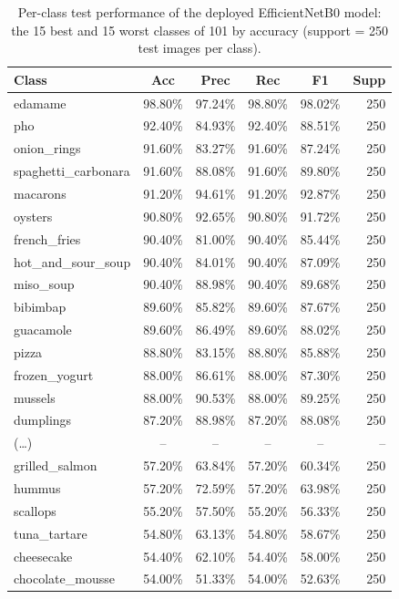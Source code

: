 \begin{table}[t]
\centering
\caption{Per-class test performance of the deployed EfficientNetB0 model: the 15 best and 15 worst classes of 101 by accuracy (support = 250 test images per class).}
\label{tbl:perclass}
\small
\begin{tabular}{lccccr}
\toprule
Class & Acc & Prec & Rec & F1 & Supp \\
\midrule
edamame & 98.80\% & 97.24\% & 98.80\% & 98.02\% & 250 \\
pho & 92.40\% & 84.93\% & 92.40\% & 88.51\% & 250 \\
onion\_rings & 91.60\% & 83.27\% & 91.60\% & 87.24\% & 250 \\
spaghetti\_carbonara & 91.60\% & 88.08\% & 91.60\% & 89.80\% & 250 \\
macarons & 91.20\% & 94.61\% & 91.20\% & 92.87\% & 250 \\
oysters & 90.80\% & 92.65\% & 90.80\% & 91.72\% & 250 \\
french\_fries & 90.40\% & 81.00\% & 90.40\% & 85.44\% & 250 \\
hot\_and\_sour\_soup & 90.40\% & 84.01\% & 90.40\% & 87.09\% & 250 \\
miso\_soup & 90.40\% & 88.98\% & 90.40\% & 89.68\% & 250 \\
bibimbap & 89.60\% & 85.82\% & 89.60\% & 87.67\% & 250 \\
guacamole & 89.60\% & 86.49\% & 89.60\% & 88.02\% & 250 \\
pizza & 88.80\% & 83.15\% & 88.80\% & 85.88\% & 250 \\
frozen\_yogurt & 88.00\% & 86.61\% & 88.00\% & 87.30\% & 250 \\
mussels & 88.00\% & 90.53\% & 88.00\% & 89.25\% & 250 \\
dumplings & 87.20\% & 88.98\% & 87.20\% & 88.08\% & 250 \\
(\dots) & -- & -- & -- & -- & -- \\
grilled\_salmon & 57.20\% & 63.84\% & 57.20\% & 60.34\% & 250 \\
hummus & 57.20\% & 72.59\% & 57.20\% & 63.98\% & 250 \\
scallops & 55.20\% & 57.50\% & 55.20\% & 56.33\% & 250 \\
tuna\_tartare & 54.80\% & 63.13\% & 54.80\% & 58.67\% & 250 \\
cheesecake & 54.40\% & 62.10\% & 54.40\% & 58.00\% & 250 \\
chocolate\_mousse & 54.00\% & 51.33\% & 54.00\% & 52.63\% & 250 \\

\end{tabular}
\end{table}
